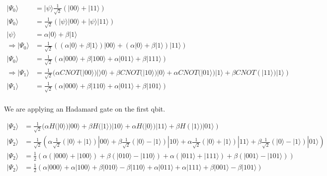 \documentclass{article}
\begin{document}
\begin{equation}
    \begin{split}
        |\Psi_0\rangle & = |\psi\rangle\frac{1}{\sqrt{2}}(|00\rangle + |11\rangle) \\
        |\Psi_0\rangle & = \frac{1}{\sqrt{2}}(|\psi\rangle|00\rangle + |\psi\rangle|11\rangle) \\
        |\psi\rangle & = \alpha|0\rangle + \beta|1\rangle \\
        \Longrightarrow |\Psi_0\rangle & = \frac{1}{\sqrt{2}}((\alpha|0\rangle + \beta|1\rangle)|00\rangle + (\alpha|0\rangle + \beta|1\rangle)|11\rangle) \\
        |\Psi_0\rangle & = \frac{1}{\sqrt{2}}(\alpha|000\rangle + \beta|100\rangle + \alpha|011\rangle + \beta|111\rangle) \\
        \Longrightarrow |\Psi_1\rangle & = \frac{1}{\sqrt{2}}(\alpha CNOT(|00\rangle)|\rangle0\rangle
            + \beta CNOT(|10\rangle)|0\rangle
            + \alpha CNOT(|01\rangle)|1\rangle
            + \beta CNOT(|11\rangle)|1\rangle) \\
        |\Psi_1\rangle & = \frac{1}{\sqrt{2}}
            (\alpha|000\rangle + \beta|110\rangle + \alpha|011\rangle + \beta|101\rangle) \\
    \end{split}
\end{equation}

We are applying an Hadamard gate on the first qbit.

\begin{equation}
    \begin{split}
        |\Psi_2\rangle & = \frac{1}{\sqrt{2}}
            (\alpha H(|0\rangle)|00\rangle 
            + \beta H(|1\rangle)|10\rangle 
            + \alpha H(|0\rangle)|11\rangle 
            + \beta H(|1\rangle)|01\rangle) \\
        |\Psi_2\rangle & = \frac{1}{\sqrt{2}}
            (\alpha\frac{1}{\sqrt{2}}(|0\rangle + |1\rangle)|00\rangle
            + \beta\frac{1}{\sqrt{2}}(|0\rangle - |1\rangle)|10\rangle 
            + \alpha\frac{1}{\sqrt{2}}(|0\rangle + |1\rangle)|11\rangle 
            + \beta\frac{1}{\sqrt{2}}(|0\rangle - |1\rangle)|01\rangle) \\
        |\Psi_2\rangle & = \frac{1}{2}(\alpha(|000\rangle + |100\rangle)
            + \beta(|010\rangle - |110\rangle)
            + \alpha(|011\rangle + |111\rangle)
            + \beta(|001\rangle - |101\rangle)) \\
        |\Psi_2\rangle & = \frac{1}{2}(\alpha|000\rangle + \alpha|100\rangle
            + \beta|010\rangle - \beta|110\rangle
            + \alpha|011\rangle + \alpha|111\rangle
            + \beta|001\rangle - \beta|101\rangle) \\
    \end{split}
\end{equation}
\end{document}
